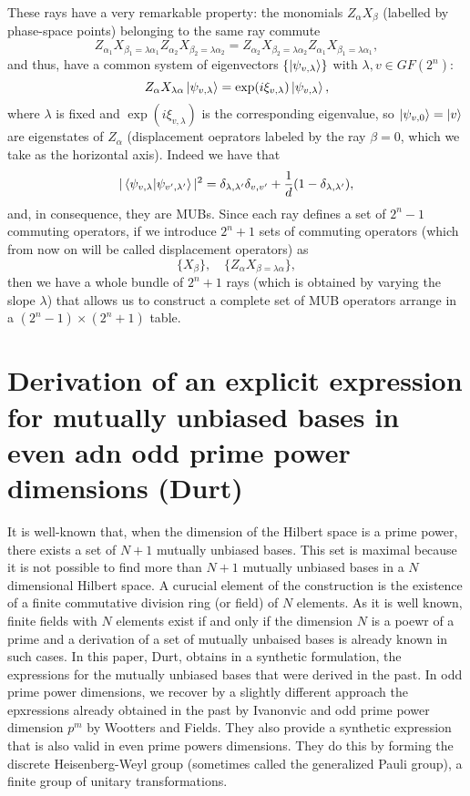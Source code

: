 \documentclass[a4paper]{article}
\begin{document}
  These rays have a very remarkable property: the monomials
  $Z_\alpha X_\beta$ (labelled by phase-space points)
  belonging to the same ray commute
  \[
    Z_{\alpha_1} X_{\beta_1=\lambda \alpha_1} Z_{\alpha_2}
    X_{\beta_2 = \lambda\alpha_2}
    = Z_{\alpha_2}X_{\beta_2=\lambda\alpha_2} Z_{\alpha_1}
    X_{\beta_1=\lambda\alpha_1},
  \] 
  and thus, have a common system of eigenvectors
  $\{\ket{\psi_{v,\lambda}}\}$ with $\lambda, v \in
  GF(2^{n})$:
  \[
    Z_\alpha X_{\lambda\alpha} \ket{\psi_{v,\lambda}} =
    \exp(i\xi_{v,\lambda}) \ket{\psi_{v,\lambda}},
  \] 
  where $\lambda$ is fixed and $\exp(i\xi_{v,\lambda})$ is
  the corresponding eigenvalue, so $\ket{\psi_{v,0}} = \ket
  v$ are eigenstates of $Z_\alpha$ (displacement oeprators
  labeled by the ray $\beta = 0$, which we take as the
  horizontal axis). Indeed we have that
  \[
    |\braket{\psi_{v,\lambda}|\psi_{v',\lambda'}}|^2
    = \delta_{\lambda,\lambda'} \delta_{v,v'} + \frac{1}{d}
    (1-\delta_{\lambda,\lambda'}),
  \] 
  and, in consequence, they are MUBs. Since each ray defines
  a set of $2^{n}-1$ commuting operators, if we introduce
  $2^{n}+1$ sets of commuting operators (which from now on
  will be called displacement operators) as
  \[
    \{X_\beta\},
    \quad
    \{Z_\alpha X_{\beta=\lambda\alpha}\},
  \] 
  then we have a whole bundle of $2^{n}+1$ rays (which is
  obtained by varying the slope $\lambda$) that allows us to
  construct a complete set of MUB operators arrange in a
  $(2^{n}-1)\times(2^{n}+1)$ table.

  \section{Derivation of an explicit expression for mutually
  unbiased bases in even adn odd prime power dimensions
  (Durt)}

  It is well-known that, when the dimension of the Hilbert
  space is a prime power, there exists a set of $N+1$ 
  mutually unbiased bases. This set is maximal because it is
  not possible to find more than $N+1$ mutually unbiased
  bases in a $N$ dimensional Hilbert space. A curucial
  element of the construction is the existence of a finite
  commutative division ring (or field) of $N$ elements. As
  it is well known, finite fields with $N$ elements exist if
  and only if the dimension $N$ is a poewr of a prime and a
  derivation of a set of mutually unbaised bases is already
  known in such cases. In this paper, Durt, obtains in a
  synthetic formulation, the expressions for the mutually
  unbiased bases that were derived in the past. In odd prime
  power dimensions, we recover by a slightly different
  approach the epxressions already obtained in the past by
  Ivanonvic and odd prime power dimension $p^{m}$ by
  Wootters and Fields. They also provide a synthetic
  expression that is also valid in even prime powers
  dimensions. They do this by forming the discrete
  Heisenberg-Weyl group (sometimes called the generalized
  Pauli group), a finite group of unitary transformations.
\end{document}

